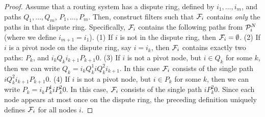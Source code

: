 \begin{proof}
Assume that a routing system has a dispute ring, defined by $i_1,
\ldots, i_m$, and paths $Q_1,\ldots, Q_m$, $P_1,\ldots, P_m$.  Then, construct
filters such that $\F_i$ contains {\em only} the paths in that
dispute ring.  Specifically, $\F_i$ contains the following paths
from $\P_i^N$ (where we define $i_{m+1} = i_1$).
(1) If $i$ is not in the dispute ring, then $\F_i = \emptyset$.
(2) If $i$ is a pivot node on the dispute ring, say $i = i_k$, then $\F_i$ contains
  exactly two paths: $P_k$, and $i_k Q_k i_{k+1} P_{k+1}
0$.
(3) If $i$ is not a pivot node, but $i \in Q_k$ for some $k$,
then we can write $Q_k = i_k Q_k^1 i Q_k^2 i_{k+1}$.  In this case
$\F_i$ consists of the single path $i Q_k^2 i_{k+1} P_{k+1} 0$.
(4) If $i$ is not a pivot node, but $i\in P_k$ for some $k$, then we
can write $P_k = i_k P_k^1 i P_k^2 0$.  In this case, $\F_i$ consists
  of the   single path $i P_k^2 0$.
Since each node appears at most once on the dispute ring, the
preceding definition uniquely defines $\F_i$ for all nodes $i$.


\end{proof}
